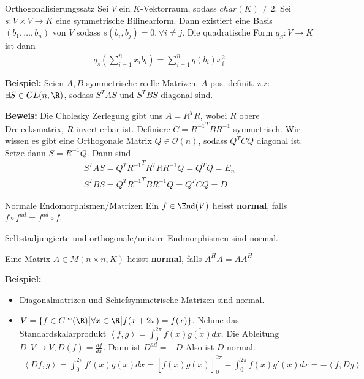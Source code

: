 \begin{nosatz}{Orthogonalisierungssatz}
    Sei $V$ ein $K$-Vektorraum, sodass $char(K) \neq 2$. Sei $s: V \times V \to K$ eine symmetrische Bilinearform. Dann existiert eine Basis $(b_{1}, \ldots, b_{n})$ von $V$ sodass $s(b_i,b_j) = 0, \forall i \neq j$.
    Die quadratische Form $q_S: V \to K$ ist dann
    \begin{align*}
        q_s \left(
            \sum_{i = 1}^{n} x_i b_i
        \right) = \sum_{i = 1}^{n} q(b_i)x_i^2
    \end{align*}
\end{nosatz}

\textbf{Beispiel:} Seien $A,B$ symmetrische reelle Matrizen, $A$ pos. definit. z.z: $\exists S \in GL(n,\R)$, sodass $S^TAS$ und $S^TBS$ diagonal sind.

\textbf{Beweis:} \quad Die Cholesky Zerlegung gibt uns $A = R^TR$, wobei $R$ obere Dreiecksmatrix, $R$ invertierbar ist.
Definiere $C = {R^{-1}}^TBR^{-1}$ symmetrisch. Wir wissen es gibt eine Orthogonale Matrix $Q \in \mathcal{O}(n)$, sodass $Q^TCQ$ diagonal ist.
Setze dann $S = R^{-1}Q$. Dann sind 
\begin{align*}
    S^TAS = Q^T{R^{-1}}^TR^TRR^{-1}Q = Q^TQ = E_n\\
    S^TBS = Q^T{R^{-1}}^TBR^{-1}Q = Q^TCQ = D
\end{align*}

\begin{definition}{Normale Endomorphismen/Matrizen}
    Ein $f \in \End(V)$ heisst \textbf{normal}, falls $f \circ f^{ad} = f^{ad} \circ f$.

    Selbstadjungierte und orthogonale/unitäre Endmorphismen sind normal.

    Eine Matrix $A \in M(n\times n,K)$ heisst \textbf{normal}, falls $A^HA = AA^H$
\end{definition}


\textbf{Beispiel:} \quad \begin{itemize}
    \item   Diagonalmatrizen und Schiefsymmetrische Matrizen sind normal.
    \item   $V = \{f \in C^\infty(\R) \big\vert \forall x \in \R \big\vert f(x + 2\pi) = f(x)\}$. Nehme das Standardskalarprodukt $\left<f,g\right> = \int_{0}^{2\pi} f(x) \overline{g(x)} dx$.  Die Ableitung $D: V \to V, D(f) = \frac{df}{dx}$. Dann ist $D^{ad} = -D$ Also ist $D$ normal.
    \begin{align*}
        \left<Df,g\right> = \int_{0}^{2\pi} f'(x)\overline{g(x)}dx = [f(x) \overline{g(x)}]_{0}^{2\pi} - \int_{0}^{2\pi} f(x) \overline{g'(x)}dx = -\left<f,Dg\right>
    \end{align*}
\end{itemize}

